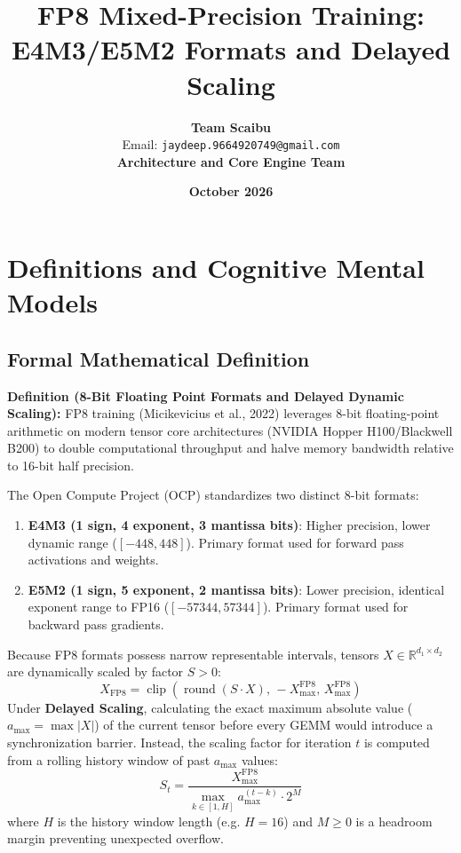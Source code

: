 \documentclass[11pt,a4paper]{article}
\title{\textbf{FP8 Mixed-Precision Training: E4M3/E5M2 Formats and Delayed Scaling}}
\author{\textbf{Team Scaibu} \\ \small Email: \texttt{jaydeep.9664920749@gmail.com} \\ \small \textbf{Architecture and Core Engine Team}}
\date{\textbf{October 2026}}
\theoremstyle{definition}
\begin{document}
\maketitle

\section{Definitions and Cognitive Mental Models}

\subsection{Formal Mathematical Definition}
\textbf{Definition (8-Bit Floating Point Formats and Delayed Dynamic Scaling):}
FP8 training (Micikevicius et al., 2022) leverages 8-bit floating-point arithmetic on modern tensor core architectures (NVIDIA Hopper H100/Blackwell B200) to double computational throughput and halve memory bandwidth relative to 16-bit half precision.

The Open Compute Project (OCP) standardizes two distinct 8-bit formats:
\begin{enumerate}
    \item \textbf{E4M3 (1 sign, 4 exponent, 3 mantissa bits)}: Higher precision, lower dynamic range ($[-448, 448]$). Primary format used for forward pass activations and weights.
    \item \textbf{E5M2 (1 sign, 5 exponent, 2 mantissa bits)}: Lower precision, identical exponent range to FP16 ($[-57344, 57344]$). Primary format used for backward pass gradients.
\end{enumerate}

Because FP8 formats possess narrow representable intervals, tensors $X \in \mathbb{R}^{d_1 \times d_2}$ are dynamically scaled by factor $S > 0$:
{\boldmath
\begin{equation}
X_{\text{FP8}} = \operatorname{clip}\left( \operatorname{round}(S \cdot X), \, -X_{\max}^{\text{FP8}}, \, X_{\max}^{\text{FP8}} \right)
\end{equation}
}
Under \textbf{Delayed Scaling}, calculating the exact maximum absolute value ($a_{\max} = \max |X|$) of the current tensor before every GEMM would introduce a synchronization barrier. Instead, the scaling factor for iteration $t$ is computed from a rolling history window of past $a_{\max}$ values:
{\boldmath
\begin{equation}
S_t = \frac{X_{\max}^{\text{FP8}}}{\max_{k \in [1, H]} a_{\max}^{(t-k)} \cdot 2^M}
\end{equation}
}
where $H$ is the history window length (e.g. $H=16$) and $M \ge 0$ is a headroom margin preventing unexpected overflow.
\end{document}
